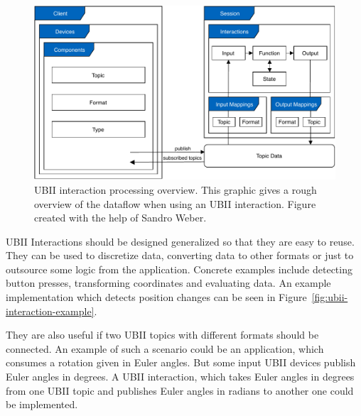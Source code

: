 \begin{figure}[htpb]
  \centering
  \includegraphics[width=12cm]{figures/ubii_cd.pdf}
  \caption[UBII communication diagram]{\ac{UBII} interaction processing overview. This graphic gives a rough overview of the dataflow when using an \ac{UBII} interaction. Figure created with the help of Sandro Weber.}\label{fig:ubii-cd}
\end{figure}

\ac{UBII} Interactions should be designed generalized so that they are easy to reuse. They can be used to discretize data, converting data to other formats or just to outsource some logic from the application. Concrete examples include detecting button presses, transforming coordinates and evaluating data. An example implementation which detects position changes can be seen in Figure~\ref{fig:ubii-interaction-example}.

They are also useful if two \ac{UBII} topics with different formats should be connected. An example of such a scenario could be an application, which consumes a rotation given in Euler angles. But some input \ac{UBII} devices publish Euler angles in degrees. A \ac{UBII} interaction, which takes Euler angles in degrees from one \ac{UBII} topic and publishes Euler angles in radians to another one could be implemented.

